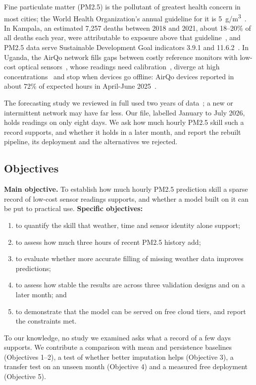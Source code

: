 \documentclass{ieeeaccess}
\newcommand{\ugm}{\textmu g/m\textsuperscript{3}}
\begin{document}
Fine particulate matter (PM2.5) is the pollutant of greatest health concern in most cities; the World Health Organization's annual guideline for it is 5~\ugm{}~\cite{ref01}. In Kampala, an estimated 7,257 deaths between 2018 and 2021, about 18--20\% of all deaths each year, were attributable to exposure above that guideline~\cite{ref21}, and PM2.5 data serve Sustainable Development Goal indicators 3.9.1 and 11.6.2~\cite{ref22,ref23}. In Uganda, the AirQo network fills gaps between costly reference monitors with low-cost optical sensors~\cite{ref02,ref03}, whose readings need calibration~\cite{ref04}, diverge at high concentrations~\cite{ref05} and stop when devices go offline: AirQo devices reported in about 72\% of expected hours in April-June 2025~\cite{ref_sserunjogi2025}.

The forecasting study we reviewed in full used two years of data~\cite{ref06}; a new or intermittent network may have far less. Our file, labelled January to July 2026, holds readings on only eight days. We ask how much hourly PM2.5 skill such a record supports, and whether it holds in a later month, and report the rebuilt pipeline, its deployment and the alternatives we rejected.

\subsection{Objectives}\label{sec:objectives}

\textbf{Main objective.} To establish how much hourly PM2.5 prediction skill a sparse record of low-cost sensor readings supports, and whether a model built on it can be put to practical use. \textbf{Specific objectives:}

\begin{enumerate}
\item to quantify the skill that weather, time and sensor identity alone support;
\item to assess how much three hours of recent PM2.5 history add;
\item to evaluate whether more accurate filling of missing weather data improves predictions;
\item to assess how stable the results are across three validation designs and on a later month; and
\item to demonstrate that the model can be served on free cloud tiers, and report the constraints met.
\end{enumerate}

To our knowledge, no study we examined asks what a record of a few days supports. We contribute a comparison with mean and persistence baselines (Objectives 1--2), a test of whether better imputation helps (Objective 3), a transfer test on an unseen month (Objective 4) and a measured free deployment (Objective 5).
\end{document}
